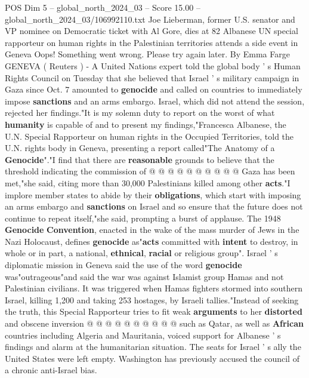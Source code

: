 \begin{textsample}{POS Dim 5 – global\_north\_2024\_03 – Score 15.00 – global\_north\_2024\_03/106992110.txt}  \label{ex:f5_pos_293}
Joe Lieberman, former U.S. senator and VP nominee on Democratic ticket with Al Gore, dies at 82 Albanese UN special rapporteur on human rights in the Palestinian territories attends a side event in Geneva Oops!
Something went wrong.
Please try again later.
By Emma Farge GENEVA ( Reuters ) - A United Nations expert told the global body ' s Human Rights Council on Tuesday that she believed that Israel ' s military campaign in Gaza since Oct. 7 amounted to \textbf{genocide} and called on countries to immediately impose \textbf{sanctions} and an arms embargo.
Israel, which did not attend the session, rejected her findings."It is my solemn duty to report on the worst of what \textbf{humanity} is capable of and to present my findings,"Francesca Albanese, the U.N.
Special Rapporteur on human rights in the Occupied Territories, told the U.N. rights body in Geneva, presenting a report called"The Anatomy of a \textbf{Genocide}"."I find that there are \textbf{reasonable} grounds to believe that the threshold indicating the commission of @ @ @ @ @ @ @ @ @ @ Gaza has been met,"she said, citing more than 30,000 Palestinians killed among other \textbf{acts}."I implore member states to abide by their \textbf{obligations}, which start with imposing an arms embargo and \textbf{sanctions} on Israel and so ensure that the future does not continue to repeat itself,"she said, prompting a burst of applause.
The 1948 \textbf{Genocide} \textbf{Convention}, enacted in the wake of the mass murder of Jews in the Nazi Holocaust, defines \textbf{genocide} as"\textbf{acts} committed with \textbf{intent} to destroy, in whole or in part, a national, \textbf{ethnical}, \textbf{racial} or religious group".
Israel ' s diplomatic mission in Geneva said the use of the word \textbf{genocide} was"outrageous"and said the war was against Islamist group Hamas and not Palestinian civilians.
It was triggered when Hamas fighters stormed into southern Israel, killing 1,200 and taking 253 hostages, by Israeli tallies."Instead of seeking the truth, this Special Rapporteur tries to fit weak \textbf{arguments} to her \textbf{distorted} and obscene inversion @ @ @ @ @ @ @ @ @ @ such as Qatar, as well as \textbf{African} countries including Algeria and Mauritania, voiced support for Albanese ' s findings and alarm at the humanitarian situation.
The seats for Israel ' s ally the United States were left empty.
Washington has previously accused the council of a chronic anti-Israel bias.

\end{textsample}
